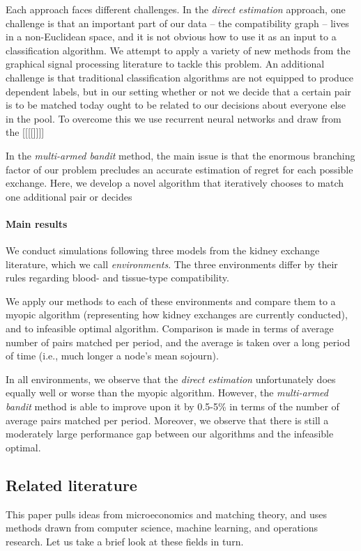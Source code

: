 \documentclass[format=acmsmall, review=false]{acmart}
\begin{document}
Each approach faces different challenges. In the \emph{direct estimation} approach, one challenge is that an important part of our data -- the compatibility graph -- lives in a non-Euclidean space, and it is not obvious how to use it as an input to a classification algorithm. We attempt to apply a variety of new methods from the graphical signal processing literature to tackle this problem. An additional challenge is that traditional classification algorithms are not equipped to produce dependent labels, but in our setting whether or not we decide that a certain pair is to be matched today ought to be related to our decisions about everyone else in the pool. To overcome this we use recurrent neural networks and draw from the [[[[]]]]

In the \emph{multi-armed bandit} method, the main issue is that the enormous branching factor of our problem precludes an accurate estimation of regret for each possible exchange. Here, we develop a novel algorithm that iteratively chooses to match one additional pair or decides


\paragraph{\textbf{Main results}} We conduct simulations following three models from the kidney exchange literature, which we call \emph{environments}. The three environments differ by their rules regarding blood- and tissue-type compatibility.

We apply our methods to each of these environments and compare them to a myopic algorithm (representing how kidney exchanges are currently conducted), and to infeasible optimal algorithm. Comparison is made in terms of average number of pairs matched per period, and the average is taken over a long period of time (i.e., much longer a node's mean sojourn).

In all environments, we observe that the \emph{direct estimation} unfortunately does equally well or worse than the myopic algorithm. However, the \emph{multi-armed bandit} method is able to improve upon it by 0.5-5\% in terms of the number of average pairs matched per period. Moreover, we observe that there is still a moderately large performance gap between our algorithms and the infeasible optimal.


\subsection{Related literature} This paper pulls ideas from microeconomics and matching theory, and uses methods drawn from computer science, machine learning, and operations research. Let us take a brief look at these fields in turn. 
\end{document}
